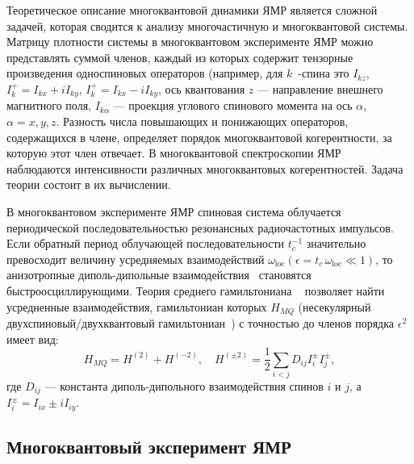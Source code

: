 Теоретическое описание многоквантовой динамики ЯМР является сложной задачей, которая сводится к анализу многочастичную и многоквантовой системы. Матрицу плотности системы в многоквантовом эксперименте ЯМР можно представлять суммой членов, каждый из которых содержит тензорные произведения односпиновых операторов
(например, для $k$~-спина это $I_{kz}$,
$I_k^+ = I_{kx} + iI_{ky}$, $I_k^+ = I_{kx} - iI_{ky}$,
ось квантования $z$ --- направление внешнего магнитного поля,
$I_{k\alpha}$ --- проекция углового спинового момента на ось $\alpha$,
$\alpha=x,y,z$.
Разность числа повышающих и понижающих операторов, содержащихся в члене, определяет порядок многоквантовой когерентности, за которую этот член отвечает.
В многоквантовой спектроскопии ЯМР~\cite{Baum1985} наблюдаются интенсивности различных многоквантовых когерентностей.
Задача теории состоит в их вычислении.

В многоквантовом эксперименте ЯМР спиновая
система облучается периодической последовательностью резонансных радиочастотных импульсов.
Если обратный период облучающей последовательности $t_{c}^{-1}$
значительно превосходит величину усредняемых взаимодействий
$\omega_\mathrm{loc} (\epsilon = t_{c}\, \omega_\mathrm{loc} \ll 1)$,
то анизотропные диполь-дипольные взаимодействия~\cite{Goldman1970} становятся быстроосциллирующими.
Теория среднего гамильтониана ~\cite{Haberlen1969} позволяет найти усредненные взаимодействия,
гамильтониан которых $H_{MQ}$ (несекулярный двухспиновый/двухквантовый гамильтониан~\cite{Baum1985})
с точностью до членов порядка $\epsilon^2$ имеет вид:
\begin{equation}\label{eq:hmq}
    H_{MQ} = H^{(2)} + H^{(-2)},
    \quad
    H^{(\pm2)} = \frac 1 2 \sum_{i < j} D_{ij} I^\pm_i I^\pm_j,
\end{equation}
где $D_{ij}$ --- константа диполь-дипольного взаимодействия спинов $i$ и $j$, а $I^\pm_i = I_{ix} \pm iI_{iy}$.


\subsection{Многоквантовый эксперимент ЯМР}\label{sec:mq-nrm-experiment}
%

%
%
%
%
%

